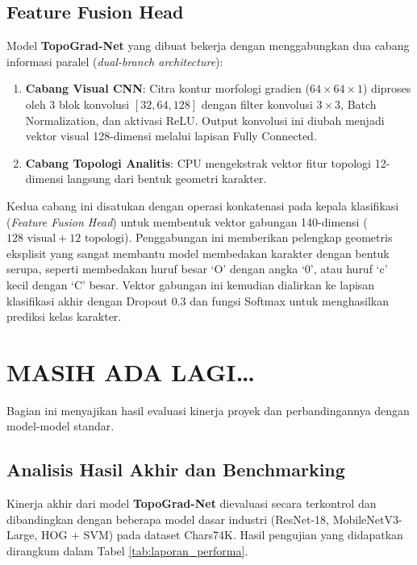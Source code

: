 \documentclass[12pt,a4paper]{article}
\begin{document}
\subsection*{Feature Fusion Head}
Model \textbf{TopoGrad-Net} yang dibuat bekerja dengan menggabungkan dua cabang informasi paralel (\textit{dual-branch architecture}):
\begin{enumerate}
    \item \textbf{Cabang Visual CNN}: Citra kontur morfologi gradien ($64 \times 64 \times 1$) diproses oleh 3 blok konvolusi $[32, 64, 128]$ dengan filter konvolusi $3 \times 3$, Batch Normalization, dan aktivasi ReLU. Output konvolusi ini diubah menjadi vektor visual 128-dimensi melalui lapisan Fully Connected.
    \item \textbf{Cabang Topologi Analitis}: CPU mengekstrak vektor fitur topologi 12-dimensi langsung dari bentuk geometri karakter.
\end{enumerate}
Kedua cabang ini disatukan dengan operasi konkatenasi pada kepala klasifikasi (\textit{Feature Fusion Head}) untuk membentuk vektor gabungan 140-dimensi ($128 \text{ visual} + 12 \text{ topologi}$). Penggabungan ini memberikan pelengkap geometris eksplisit yang sangat membantu model membedakan karakter dengan bentuk serupa, seperti membedakan huruf besar `O' dengan angka `0', atau huruf `c' kecil dengan `C' besar. Vektor gabungan ini kemudian dialirkan ke lapisan klasifikasi akhir dengan Dropout 0.3 dan fungsi Softmax untuk menghasilkan prediksi kelas karakter.

\section*{MASIH ADA LAGI…}
Bagian ini menyajikan hasil evaluasi kinerja proyek dan perbandingannya dengan model-model standar.

\subsection*{Analisis Hasil Akhir dan Benchmarking}
Kinerja akhir dari model \textbf{TopoGrad-Net} dievaluasi secara terkontrol dan dibandingkan dengan beberapa model dasar industri (ResNet-18, MobileNetV3-Large, HOG + SVM) pada dataset Chars74K. Hasil pengujian yang didapatkan dirangkum dalam Tabel \ref{tab:laporan_performa}.
\end{document}

